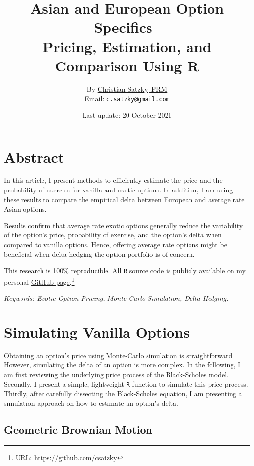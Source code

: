 \documentclass[
  12pt,
]{article}
\title{Asian and European Option Specifics--\\
Pricing, Estimation, and Comparison Using R}
\author{By \href{https://www.linkedin.com/in/christian-satzky/}{Christian
Satzky, FRM}\\
Email: \href{mailto:c.satzky@gmail.com}{\nolinkurl{c.satzky@gmail.com}}}
\date{Last update: 20 October 2021}
\begin{document}
\maketitle

\newpage
\hypersetup{linkcolor=black}
\tableofcontents
\newpage
\hypersetup{linkcolor=blue}

\hypertarget{abstract}{%
\section*{Abstract}\label{abstract}}

In this article, I present methods to efficiently estimate the price and
the probability of exercise for vanilla and exotic options. In addition,
I am using these results to compare the empirical delta between European
and average rate Asian options.

Results confirm that average rate exotic options generally reduce the
variability of the option's price, probability of exercise, and the
option's delta when compared to vanilla options. Hence, offering average
rate options might be beneficial when delta hedging the option portfolio
is of concern.

This research is 100\% reproducible. All \texttt{R} source code is
publicly available on my personal
\href{https://github.com/csatzky}{GitHub page}.\footnote{URL:
  \url{https://github.com/csatzky}}

\emph{Keywords: Exotic Option Pricing, Monte Carlo Simulation, Delta
Hedging.}

\newpage

\hypertarget{simulating-vanilla-options}{%
\section{Simulating Vanilla Options}\label{simulating-vanilla-options}}

Obtaining an option's price using Monte-Carlo simulation is
straightforward. However, simulating the delta of an option is more
complex. In the following, I am first reviewing the underlying price
process of the Black-Scholes model. Secondly, I present a simple,
lightweight \texttt{R} function to simulate this price process. Thirdly,
after carefully dissecting the Black-Scholes equation, I am presenting a
simulation approach on how to estimate an option's delta.

\hypertarget{geometric-brownian-motion}{%
\subsection{Geometric Brownian Motion}\label{geometric-brownian-motion}}
\end{document}
